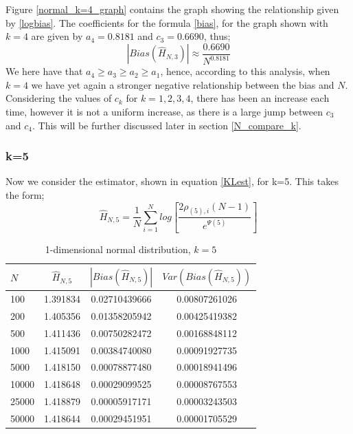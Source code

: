 \documentclass{article}
\begin{document}
Figure \ref{normal_k=4_graph} contains the graph showing the relationship given by \ref{logbias}. The coefficients for the formula \ref{bias}, for the graph shown with $k=4$ are given by $a_{4} = 0.8181$ and $c_{3} = 0.6690$, thus;
\begin{equation}
|Bias(\hat{H}_{N, 3})| \approx \frac{0.6690}{N^{0.8181}} \nonumber
\end{equation}
 We here have that $a_{4} \geq a_{3} \geq a_{2} \geq a_{1}$, hence, according to this analysis, when $k=4$ we have yet again a stronger negative relationship between the bias and $N$. Considering the values of $c_{k}$ for $k=1,2,3,4$, there has been an increase each time, however it is not a uniform increase, as there is a large jump between $c_{3}$ and $c_{4}$. This will be further discussed later in section \ref{N_compare_k}.




\subsubsection{k=5} \label{N_k=5}
Now we consider the estimator, shown in equation \ref{KLest}, for k=5. This takes the form;
\begin{equation}
\hat{H}_{N, 5} = \frac{1}{N} \sum_{i=1}^{N} log \left[ \frac{2\rho_{(5),i}(N-1)}{e^{\Psi(5)}} \right] \nonumber
\end{equation}

\begin{table}
\caption{1-dimensional normal distribution, $k=5$} \label{normal_k=5_table}
\begin{center}
\begin{tabular}{| l | c c c|} 
\toprule
$N$ & $\hat{H}_{N, 5}$ & $|Bias(\hat{H}_{N, 5})|$ & $Var(Bias(\hat{H}_{N, 5}))$ \\
\midrule[1pt]
100     & 1.391834     & 0.02710439666     & 0.00807261026  \\
200     & 1.405356     & 0.01358205942     & 0.00425419382  \\
500     & 1.411436     & 0.00750282472     & 0.00168848112  \\
1000    & 1.415091     & 0.00384740080     & 0.00091927735  \\
5000    & 1.418150     & 0.00078877480     & 0.00018941496  \\
10000   & 1.418648     & 0.00029099525     & 0.00008767553  \\
25000   & 1.418879     & 0.00005917171     & 0.00003243503  \\
50000   & 1.418644     & 0.00029451951     & 0.00001705529  \\
\hline
\end{tabular}
\end{center}
\end{table}
\end{document}
